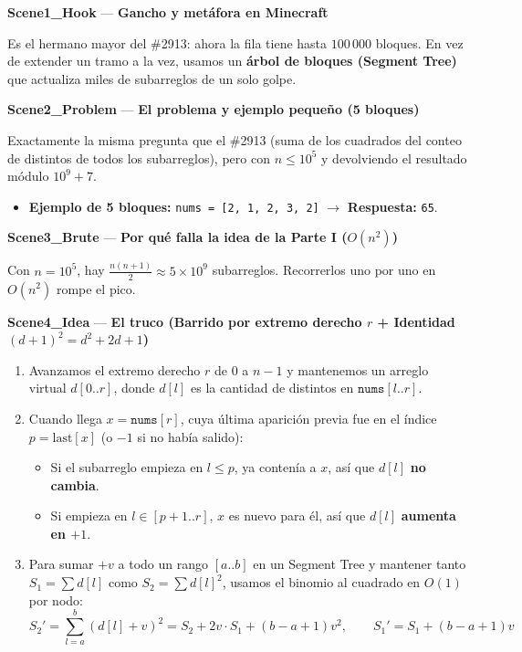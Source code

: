 \documentclass[letterpaper,10pt]{article}
\newcommand{\scene}[2]{\noindent\textbf{\textcolor{mcaqua}{#1}} --- \textbf{#2}\par\vspace{1pt}}
\begin{document}
\begin{shaded}
\scene{Scene1\_Hook}{Gancho y met\'afora en Minecraft}
Es el hermano mayor del \#2913: ahora la fila tiene hasta $100\,000$ bloques. En vez de extender un tramo a la vez, usamos un \textbf{\'arbol de bloques (Segment Tree)} que actualiza miles de subarreglos de un solo golpe.

\scene{Scene2\_Problem}{El problema y ejemplo peque\~no (5 bloques)}
Exactamente la misma pregunta que el \#2913 (suma de los cuadrados del conteo de distintos de todos los subarreglos), pero con $n \le 10^5$ y devolviendo el resultado m\'odulo $10^9 + 7$.
\begin{itemize}\setlength{\itemsep}{1pt}
  \item \textbf{Ejemplo de 5 bloques:} \texttt{nums = [2, 1, 2, 3, 2]} $\to$ \textbf{Respuesta:} \texttt{65}.
\end{itemize}

\scene{Scene3\_Brute}{Por qu\'e falla la idea de la Parte I ($O(n^2)$)}
Con $n = 10^5$, hay $\frac{n(n+1)}{2} \approx 5 \times 10^9$ subarreglos. Recorrerlos uno por uno en $O(n^2)$ rompe el pico.

\scene{Scene4\_Idea}{El truco (Barrido por extremo derecho $r$ + Identidad $(d+1)^2 = d^2 + 2d + 1$)}
\begin{enumerate}\setlength{\itemsep}{1pt}
  \item Avanzamos el extremo derecho $r$ de $0$ a $n-1$ y mantenemos un arreglo virtual $d[0..r]$, donde $d[l]$ es la cantidad de distintos en $\texttt{nums}[l..r]$.
  \item Cuando llega $x = \texttt{nums}[r]$, cuya \'ultima aparici\'on previa fue en el \'indice $p = \text{last}[x]$ (o $-1$ si no hab\'ia salido):
  \begin{itemize}\setlength{\itemsep}{1pt}
    \item Si el subarreglo empieza en $l \le p$, ya conten\'ia a $x$, as\'i que $d[l]$ \textbf{no cambia}.
    \item Si empieza en $l \in [p+1..r]$, $x$ es nuevo para \'el, as\'i que $d[l]$ \textbf{aumenta en $+1$}.
  \end{itemize}
  \item Para sumar $+v$ a todo un rango $[a..b]$ en un Segment Tree y mantener tanto $S_1 = \sum d[l]$ como $S_2 = \sum d[l]^2$, usamos el binomio al cuadrado en $O(1)$ por nodo:
  $$S_2' = \sum_{l=a}^{b} (d[l] + v)^2 = S_2 + 2v \cdot S_1 + (b - a + 1) v^2, \qquad S_1' = S_1 + (b - a + 1) v$$
\end{enumerate}


\end{shaded}
\end{document}
